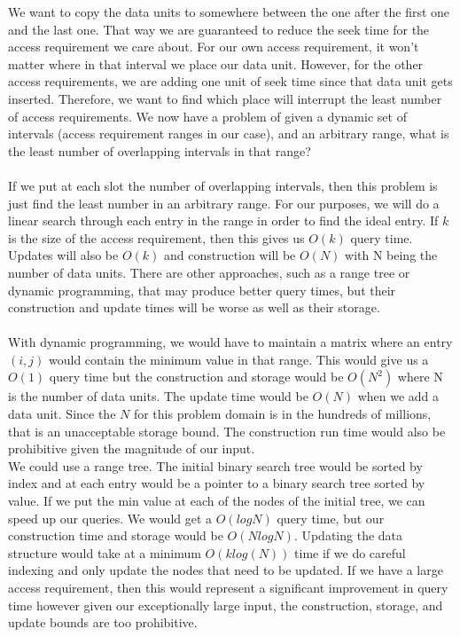 \documentclass[11pt,psfig]{article}
\begin{document}
We want to copy the data units to somewhere between the one after the first one and the last one. That way we are guaranteed to reduce the seek time for the access requirement we care about. For our own access requirement, it won't matter where in that interval we place our data unit. However, for the other access requirements, we are adding one unit of seek time since that data unit gets inserted. Therefore, we want to find which place will interrupt the least number of access requirements. We now have a problem of given a dynamic set of intervals (access requirement ranges in our case), and an arbitrary range, what is the least number of overlapping intervals in that range?\\
\\
If we put at each slot the number of overlapping intervals, then this problem is just find the least number in an arbitrary range. For our purposes, we will do a linear search through each entry in the range in order to find the ideal entry. If $k$ is the size of the access requirement, then this gives us $O(k)$ query time. Updates will also be $O(k)$ and construction will be $O(N)$ with N being the number of data units. There are other approaches, such as a range tree or dynamic programming, that may produce better query times, but their construction and update times will be worse as well as their storage. \\
\\
With dynamic programming, we would have to maintain a matrix where an entry $(i,j)$ would contain the minimum value in that range. This would give us a $O(1)$ query time but the construction and storage would be $O(N^2)$ where N is the number of data units. The update time would be $O(N)$ when we add a data unit. Since the $N$ for this problem domain is in the hundreds of millions, that is an unacceptable storage bound. The construction run time would also be prohibitive given the magnitude of our input. \\
We could use a range tree. The initial binary search tree would be sorted by index and at each entry would be a pointer to a binary search tree sorted by value. If we put the min value at each of the nodes of the initial tree, we can speed up our queries. We would get a $O(log N)$ query time, but our construction time and storage would be $O(N log N)$. Updating the data structure would take at a minimum $O(k log(N))$ time if we do careful indexing and only update the nodes that need to be updated. If we have a large access requirement, then this would represent a significant improvement in query time however given our exceptionally large input, the construction, storage, and update bounds are too prohibitive.  
\end{document}
